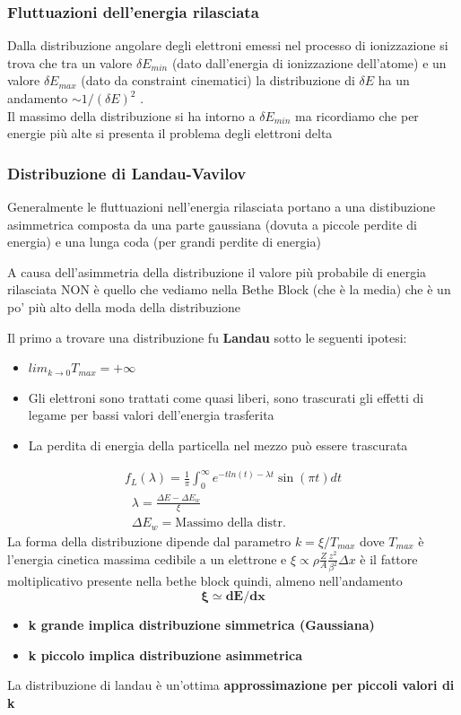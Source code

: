 \subsubsection*{Fluttuazioni dell'energia rilasciata}
Dalla distribuzione angolare degli elettroni emessi nel processo di ionizzazione si trova che tra un valore $\delta E_{min}$ (dato dall'energia di ionizzazione dell'atome) e un valore $\delta E_{max}$ (dato da constraint cinematici) la distribuzione di $\delta E$ ha un andamento $\sim 1/(\delta E)^2$ .
\\
Il massimo della distribuzione si ha intorno a $\delta E_{min}$ ma ricordiamo che per energie più alte si presenta il problema degli elettroni delta

\subsubsection*{Distribuzione di Landau-Vavilov}

Generalmente le fluttuazioni nell'energia rilasciata portano a una distibuzione asimmetrica composta da una parte gaussiana (dovuta a piccole perdite di energia) e una lunga coda (per grandi perdite di energia)

\begin{note}
    A causa dell'asimmetria della distribuzione il valore più probabile di energia rilasciata NON è quello che vediamo nella Bethe Block (che è la media) che è un po' più alto della moda della distribuzione
\end{note}
Il primo a trovare una distribuzione fu \textbf{Landau} sotto le seguenti ipotesi:
\begin{itemize}
    \item $lim_{k \to0} T_{max}= +\infty$
    \item Gli elettroni sono trattati come quasi liberi, sono trascurati gli effetti di legame per bassi valori dell'energia trasferita
    \item La perdita di energia della particella nel mezzo può essere trascurata
\end{itemize}

\[
\begin{gathered}
    f_L(\lambda)=\frac{1}{\pi}\int_0^\infty e^{-t ln (t)-\lambda t }\sin (\pi t) dt
\\
\;\;\lambda=\frac{\Delta E -\Delta E_w}{\xi} \;\;
\\
\;\;\Delta E_w=\text{Massimo della distr.}
\end{gathered}\]
La forma della distribuzione dipende dal parametro $k=\xi/T_{max}$ dove $T_{max}$ è l'energia cinetica massima cedibile a un elettrone e $\xi \propto \rho\frac{Z}{A}\frac{z^2}{\beta^2} \Delta x$  è il fattore moltiplicativo presente nella bethe block quindi, almeno nell'andamento \[\mathbf{\xi \simeq dE/dx}\]
\begin{itemize}
    \item \textbf{k grande implica distribuzione simmetrica (Gaussiana)}
\item \textbf{k piccolo implica distribuzione asimmetrica}

\end{itemize}
La distribuzione di landau è un'ottima \textbf{approssimazione per piccoli valori di k}

